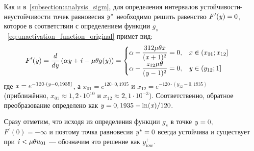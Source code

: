 Как и в~\autoref{subsection:analysis_sigm}, для определения интервалов устойчивости-неустойчивости точек равновесия $\mathit{y}^{*}$ необходимо решить равенство $F^{\prime}(\mathit{y}) = 0$, которое в соответствии с определением функции $g_{s}$~\eqref{eq:unactivation_function_original} примет вид:
\begin{equation}
\nonumber
    F^{\prime}(\mathit{y}) = \dfrac{d}{d\mathit{y}}\left( \alpha \mathit{y} + \mathit{i} - \mu \theta g(\mathit{y}) \right) = 
    \begin{cases}
        \alpha - \dfrac{312 \mu \theta \mathit{x}}{(\mathit{x} + 1)^{2}} = 0,   & \mathit{x} \in \left(x_{01}; x_{12}\right] \\
        \alpha - \dfrac{z_{12} \mu \theta}{(\mathit{y} - 1)^{2}} = 0,           & \mathit{y} \in \left(y_{12}; 1\right] \\
    \end{cases}
\end{equation}
где $\mathit{x} = e^{-120 \cdot (\mathit{y} - 0,1935)}$, а $x_{01} = e^{120 \cdot 0,1935}$ и $x_{12} = e^{-120 \cdot (y_{12} - 0,1935)}$ (приближённо, $x_{01} \approx 1,2 \cdot 10^{10}$ и $x_{12} \approx 2,1 \cdot 10^{-3}$). Соответственно, обратное преобразование определено как $\mathit{y} = 0,1935 - \ln(\mathit{x}) / 120$.

Сразу отметим, что исходя из определения функции $g_{s}$ в точке $\mathit{y} = 0$, $F^{\prime}(0) = -\infty$ и поэтому точка равновесия $\mathit{y}^{*} = 0$ всегда устойчива и существует при $\mathit{i} < \mu \theta u_{01}$ --- обозначим это решение как $y_{low}^{+}$.

